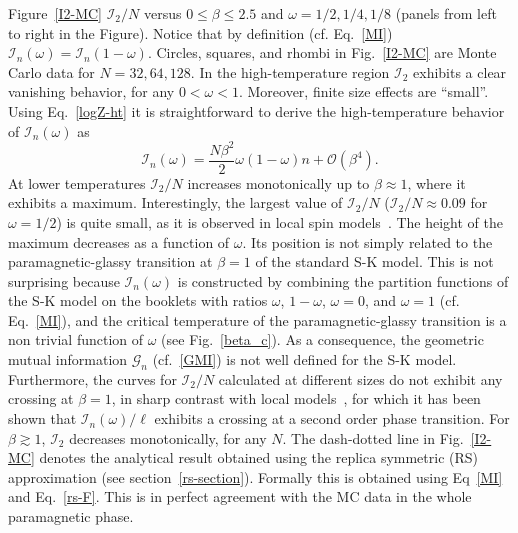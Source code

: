 \documentclass[twocolumn,superscriptaddress,prb,10pt]{revtex4-1}
\begin{document}
Figure~\ref{I2-MC} ${\mathcal I}_2/N$ versus $0\le\beta\le 2.5$ and $\omega=1/2,1/4,1/8$ 
(panels from left to right in the Figure). Notice that by definition (cf. Eq.~\eqref{MI}) 
${\mathcal I}_n(\omega)={\mathcal I}_n(1-\omega)$. Circles, squares, and rhombi in 
Fig.~\ref{I2-MC} are Monte Carlo data for $N=32,64,128$. 
In the high-temperature region ${\mathcal I}_2$ exhibits a clear vanishing 
behavior, for any $0<\omega<1$. Moreover, finite size effects are ``small''. 
Using Eq.~\eqref{logZ-ht} it is straightforward to derive the high-temperature 
behavior of ${\mathcal I}_n(\omega)$ as  
%
\begin{equation}
{\mathcal I}_n(\omega)=\frac{N\beta^2}{2}\omega(1-\omega)n+{\mathcal O}
(\beta^4).
\end{equation}
%
At lower temperatures ${\mathcal I}_2/N$ increases monotonically up to $\beta\approx 1$, 
where it exhibits a maximum. Interestingly, the largest value of ${\mathcal I}_2/N$ 
(${\mathcal I}_2/N\approx 0.09$ for $\omega=1/2$) is quite small, as it is observed in 
local spin models~\cite{jaconis-2013}. The height of the maximum decreases as a function of 
$\omega$. Its position is not simply related to the paramagnetic-glassy transition at $\beta=1$ 
of the standard S-K model. This is not surprising because ${\mathcal I}_n(\omega)$ is constructed 
by combining the partition functions of the S-K model on the booklets with ratios $\omega$, 
$1-\omega$, $\omega=0$, and $\omega=1$ (cf. Eq.~\eqref{MI}), and the critical temperature of 
the paramagnetic-glassy transition is a non trivial function of $\omega$ (see Fig.~\ref{beta_c}). 
As a consequence, the geometric mutual information ${\mathcal G}_n$ (cf.~\eqref{GMI}) 
is not well defined for the S-K model. 
Furthermore, the curves for ${\mathcal I}_2/N$ calculated at different sizes do not exhibit any 
crossing at $\beta=1$, in sharp contrast with local models~\cite{jaconis-2013}, for which it has 
been shown that ${\mathcal I}_n(\omega)/\ell$ exhibits a crossing at a second order phase transition. 
For $\beta\gtrsim 1$, ${\mathcal I}_2$ decreases monotonically, for any $N$. 
The dash-dotted line in Fig.~\ref{I2-MC} denotes the analytical result obtained using the replica 
symmetric (RS) approximation (see section~\ref{rs-section}). Formally this is obtained using 
Eq~\eqref{MI} and Eq.~\eqref{rs-F}. This is in perfect agreement with the 
MC data in the whole paramagnetic phase.  
\end{document}
